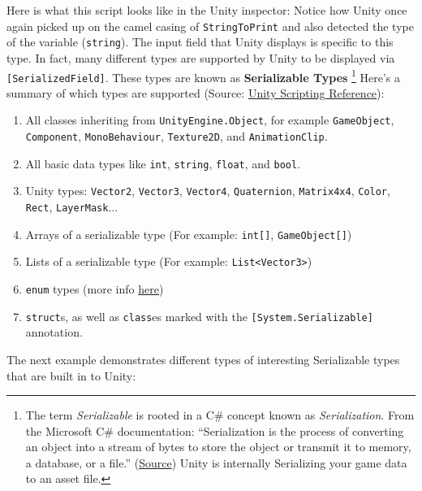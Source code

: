 \documentclass[11pt]{article}
\begin{document}
Here is what this script looks like in the Unity inspector:
Notice how Unity once again picked up on the camel casing of \texttt{StringToPrint} and also
detected the type of the variable (\texttt{string}).  The input field that Unity displays is
specific to this type.  In fact, many different types are supported by Unity to be displayed via
\texttt{[SerializedField]}.  These types are known as \textbf{Serializable Types} \footnote{
The term \textit{Serializable} is rooted in a C\# concept known as \textit{Serialization}.  From
the Microsoft C\# documentation: ``Serialization is the process of converting an object into a 
stream of bytes to store the object or transmit it to memory, a database, or a file.'' 
(\href{https://docs.microsoft.com/en-us/dotnet/csharp/programming-guide/concepts/serialization/index}{Source})
Unity is internally Serializing your game data to an asset file.}
Here's a summary of which types are supported (Source:
\href{https://docs.unity3d.com/ScriptReference/SerializeField.html}{Unity Scripting Reference}):

\begin{enumerate}
    \setlength\itemsep{0.25em}
    \item All classes inheriting from \lstinline|UnityEngine.Object|, for example \lstinline|GameObject|, 
          \lstinline|Component|, \lstinline|MonoBehaviour|, \lstinline|Texture2D|, 
          and \lstinline|AnimationClip|.
    \item All basic data types like \lstinline|int|, \lstinline|string|, \lstinline|float|, 
          and \lstinline|bool|.
    \item Unity types: \lstinline|Vector2|, \lstinline|Vector3|, \lstinline|Vector4|, 
          \lstinline|Quaternion|, \lstinline|Matrix4x4|, \lstinline|Color|, \lstinline|Rect|, 
          \lstinline|LayerMask|$\dots$
    \item Arrays of a serializable type (For example: \lstinline|int[]|, \lstinline|GameObject[]|)
    \item Lists of a serializable type (For example: \lstinline|List<Vector3>|)
    \item \lstinline|enum| types (more info 
    \href{https://docs.microsoft.com/en-us/dotnet/csharp/language-reference/keywords/enum}{here})
    \item \lstinline|struct|s, as well as \lstinline|class|es marked with the 
          \lstinline|[System.Serializable]| annotation.
\end{enumerate}

\noindent The next example demonstrates different types of interesting Serializable types that are 
built in to Unity:
\pagebreak
\end{document}
